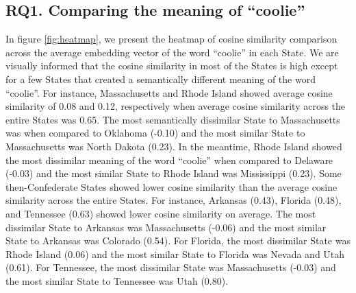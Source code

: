 \documentclass[11pt]{article}
\begin{document}
\subsection{RQ1. Comparing the meaning of ``coolie''} \label{sec:result_rq1_word_embedding}
In figure \ref{fig:heatmap}, we present the heatmap of cosine similarity comparison across the average embedding vector of the word ``coolie'' in each State.
We are visually informed that the cosine similarity in most of the States is high except for a few States that created 
a semantically different meaning of the word ``coolie''. 
For instance, Massachusetts and Rhode Island showed average cosine similarity of 0.08 and 0.12, respectively
when average cosine similarity across the entire States was 0.65.
The most semantically dissimilar State to Massachusetts was when compared to Oklahoma (-0.10) and the most similar State to Massachusetts was North Dakota (0.23). 
In the meantime, Rhode Island showed the most dissimilar meaning of the word ``coolie'' when compared to Delaware (-0.03) and the most similar State to Rhode Island was Mississippi (0.23). 
Some then-Confederate States showed lower cosine similarity than the average cosine similarity across the entire States.
For instance, Arkansas (0.43), Florida (0.48), and Tennessee (0.63) showed lower cosine similarity on average. 
The most dissimilar State to Arkansas was Massachusetts (-0.06) and the most similar State to Arkansas was Colorado (0.54).
For Florida, the most dissimilar State was Rhode Island (0.06) and the most similar State to Florida was Nevada and Utah (0.61).
For Tennessee, the most dissimilar State was Massachusetts (-0.03) and the most similar State to Tennessee was Utah (0.80).
\end{document}
